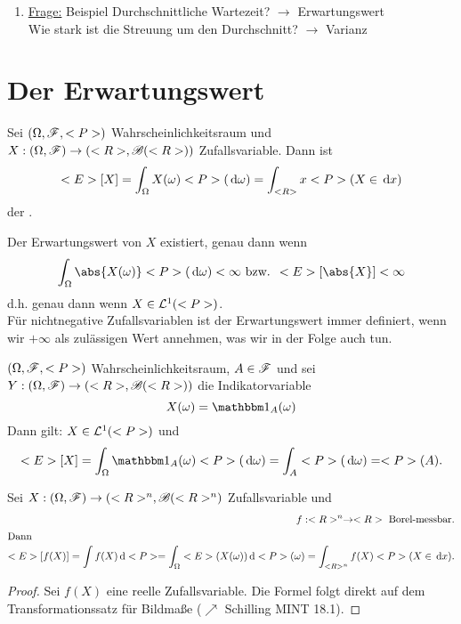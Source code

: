 \begin{enumerate}
	\item \ul{Frage:} Beispiel  Durchschnittliche Wartezeit? $\to$ Erwartungswert\\
	Wie stark ist die Streuung um den Durchschnitt? $\to$ Varianz
\end{enumerate}
\section{Der Erwartungswert}
\begin{definition}[title]
	Sei $(\Omega, \mathscr F, <P>)$ Wahrscheinlichkeitsraum und $X: (\Omega, \mathscr F) \to (<R>, \mathscr{B}(<R>))$ Zufallsvariable. Dann ist
	\begin{align*}
		<E>[X] = \int_{\Omega} X(\omega) <P>(\,\mathrm{d} \omega) = \int_{<R>} x <P>(X  \in \,\mathrm{d} x)
	\end{align*}
	der .
\end{definition}
\begin{*hint}
	Der Erwartungswert von $X$ existiert, genau dann wenn
	\begin{align*}
		\int_{\O} \abs{X(\omega)}\P(\d \omega) < \infty \bzw \E[\abs{X}] < \infty
	\end{align*}
	d.h. genau dann wenn $X \in \mathcal{L}^{1} (<P>)$.\\
	Für nichtnegative Zufallsvariablen ist der Erwartungswert immer definiert, wenn wir $+\infty$ als zulässigen Wert annehmen, was wir in der Folge auch tun.
\end{*hint}
\begin{example}
	$(\Omega, \mathscr F, <P>)$ Wahrscheinlichkeitsraum, $A \in \mathscr F$ und sei $Y: (\Omega, \mathscr F) \to (<R>, \mathscr{B}(<R>))$ die Indikatorvariable
	\[
		X(\omega) = \indi_{A} (\omega)
	\]
	Dann gilt: $X \in \mathcal{L}^{1}(<P>)$ und
	\begin{align*}
		\E[X] = \int_{\O} \indi_{A} (\omega) \P(\d \omega) = \int_{A} \P(\d \omega) = \P(A).
	\end{align*}
\end{example}
\begin{proposition}
	Sei $X: (\Omega, \mathscr F) \to (<R>^n, \mathscr{B}(<R>^n)$ Zufallsvariable und
	\begin{align*}
		f: <R>^n \to <R> \text{ Borel-messbar}.\\
		\intertext{Dann}
		<E>[f(X)] = \int f(X)\,\mathrm{d} <P> = \int_{\Omega} <E>(X(\omega)) \,\mathrm{d} <P>(\omega) = \int_{<R>^n} f(X) <P>(X \in \,\mathrm{d} x). 
	\end{align*}
\end{proposition}
\begin{proof}
	Sei $f(X)$ eine reelle Zufallsvariable. Die Formel folgt direkt auf dem Transformationssatz für Bildmaße ($\nearrow$ Schilling MINT 18.1).
\end{proof}
